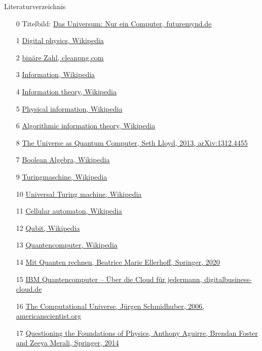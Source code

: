 \documentclass[aspectratio=1610, 9pt]{beamer}
\begin{document}
\begin{frame}{Literaturverzeichnis}
  \begin{itemize}
    \item[0] Titelbild: \href{https://www.futuremynd.de/das-universum-nur-ein-computer/}{Das Universum: Nur ein Computer, futuremynd.de}
    \item[1] \href{https://en.wikipedia.org/wiki/Digital\_physics}{Digital physics, Wikipedia}
    \item[2] \href{https://de.cleanpng.com/png-5mw0s2/}{binäre Zahl, cleanpng.com}
    \item[3] \href{https://en.wikipedia.org/wiki/Information}{Information, Wikipedia}
    \item[4] \href{https://en.wikipedia.org/wiki/Information\_theory}{Information theory, Wikipedia}
    \item[5] \href{https://en.wikipedia.org/wiki/Physical\_information}{Physical information, Wikipedia}
    \item[6] \href{https://en.wikipedia.org/wiki/Algorithmic\_information\_theory}{Algorithmic information theory, Wikipedia}
    \item[8] \href{https://arxiv.org/abs/1312.4455}{The Universe as Quantum Computer, Seth Lloyd, 2013, arXiv:1312.4455}
    \item[7] \href{https://en.wikipedia.org/wiki/Boolean\_algebra}{Boolean Algebra, Wikipedia}
    \item[9] \href{https://de.wikipedia.org/wiki/Turingmaschine}{Turingmaschine, Wikipedia}
    \item[10] \href{https://en.wikipedia.org/wiki/Universal\_Turing\_machine}{Universal Turing machine, Wikipedia}
    \item[11] \href{https://en.wikipedia.org/wiki/Cellular\_automaton}{Cellular automaton, Wikipedia}
    \item[12] \href{https://en.wikipedia.org/wiki/Qubit}{Qubit, Wikipedia}
    \item[13] \href{https://de.wikipedia.org/wiki/Quantencomputer}{Quantencomputer, Wikipedia}
    \item[14] \href{https://www.springer.com/de/book/9783658312213}{Mit Quanten rechnen, Beatrice Marie Ellerhoff, Springer, 2020}
    \item[15] \href{https://www.digitalbusiness-cloud.de/ibm-quantencomputer-ueber-die-cloud-fuer-jedermann/}{IBM Quantencomputer – Über die Cloud für jedermann, digitalbusiness-cloud.de}
    \item[16] \href{https://www.americanscientist.org/article/the-computational-universe}{The Computational Universe, Jürgen Schmidhuber, 2006, americanscientist.org}
    \item[17] \href{https://www.springer.com/de/book/9783319130446}{Questioning the Foundations of Physics, Anthony Aguirre, Brendan Foster and Zeeya Merali, Springer, 2014}
  \end{itemize}

\end{frame}
\end{document}
